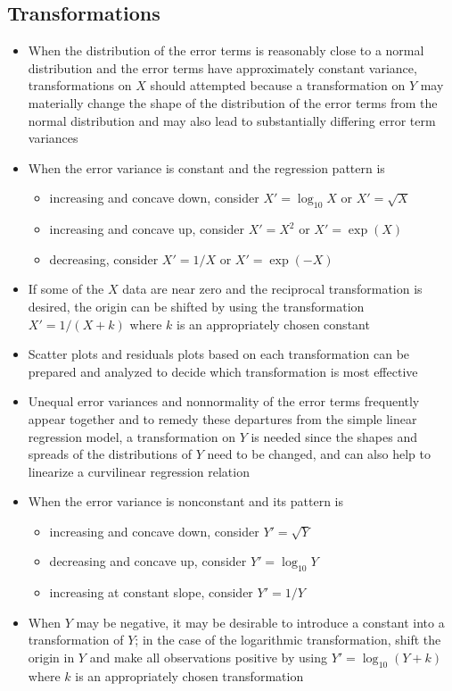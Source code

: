 \subsection{Transformations}
\begin{itemize} 
\item When the distribution of the error terms is reasonably close to a normal distribution and the error terms have approximately constant variance, transformations on $X$ should attempted because a transformation on $Y$  may materially change the shape of the distribution of the error terms from the normal distribution and may also lead to substantially differing error term variances 
\item When the error variance is constant and the regression pattern is \begin{itemize} 
\item increasing and concave down, consider $X' = \log_{10} X$ or $X' = \sqrt{X}$
\item increasing and concave up, consider $X' = X^2$ or $X' = \exp(X)$ 
\item decreasing, consider $X' = 1/X$ or $X' = \exp(-X)$ \end{itemize} 
\item If some of the $X$ data are near zero and the reciprocal transformation is desired, the origin can be shifted by using the transformation $X' = 1/(X+k)$ where $k$ is an appropriately chosen constant 
\item Scatter plots and residuals plots based on each transformation can be prepared and analyzed to decide which transformation is most effective 
\item Unequal error variances and nonnormality of the error terms frequently appear together and to remedy these departures from the simple linear regression model, a transformation on $Y$ is needed since the shapes and spreads of the distributions of $Y$ need to be changed, and can also help to linearize a curvilinear regression relation 
\item When the error variance is nonconstant and its pattern is \begin{itemize} 
\item increasing and concave down, consider $Y' = \sqrt{Y}$
\item decreasing and concave up, consider $Y' = \log_{10} Y$
\item increasing at constant slope, consider $Y' = 1/Y$ \end{itemize} 
\item When $Y$ may be negative, it may be desirable to introduce a constant into a transformation of $Y$; in the case of the logarithmic transformation, shift the origin in $Y$ and make all observations positive by using $Y' = \log_{10}(Y + k)$ where $k$ is an appropriately chosen transformation

\end{itemize}
